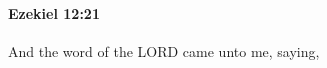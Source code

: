 
		\paragraph{Ezekiel 12:21} %
			\label{EZEKIEL-12-21}

			And the word of the LORD came unto me, saying,



